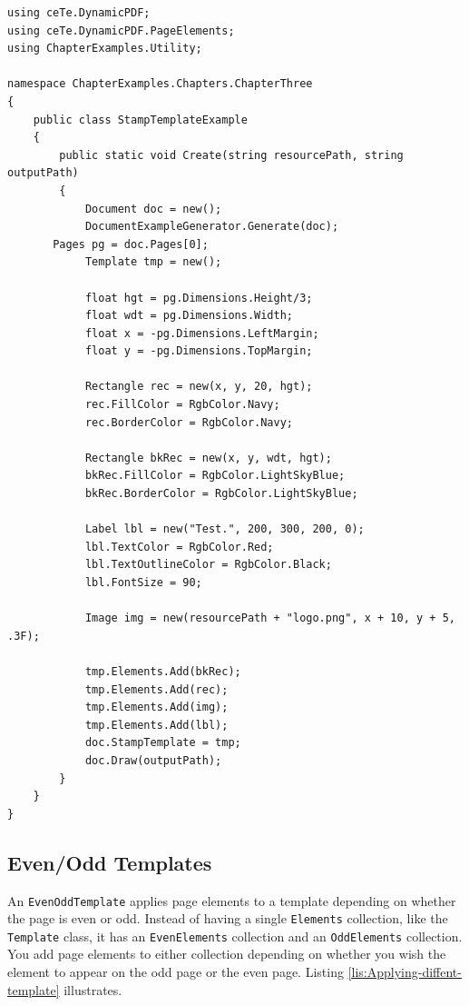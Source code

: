 \documentclass[american,letterpaper]{tufte-book}
\numberwithin{equation}{section}
\numberwithin{figure}{section}
\begin{document}
\bgroup{}
\begin{lstlisting}[caption={Using a stamp template.},label={lis:forground-Using-a-stamp},basicstyle={\small\ttfamily},breaklines=true]
using ceTe.DynamicPDF;
using ceTe.DynamicPDF.PageElements;
using ChapterExamples.Utility;

namespace ChapterExamples.Chapters.ChapterThree
{
    public class StampTemplateExample
    {
        public static void Create(string resourcePath, string outputPath)
        {
            Document doc = new();
            DocumentExampleGenerator.Generate(doc);
       Pages pg = doc.Pages[0];
            Template tmp = new();

            float hgt = pg.Dimensions.Height/3;
            float wdt = pg.Dimensions.Width;
            float x = -pg.Dimensions.LeftMargin;
            float y = -pg.Dimensions.TopMargin;

            Rectangle rec = new(x, y, 20, hgt);
            rec.FillColor = RgbColor.Navy;
            rec.BorderColor = RgbColor.Navy;

            Rectangle bkRec = new(x, y, wdt, hgt);
            bkRec.FillColor = RgbColor.LightSkyBlue;
            bkRec.BorderColor = RgbColor.LightSkyBlue;

            Label lbl = new("Test.", 200, 300, 200, 0);
            lbl.TextColor = RgbColor.Red;
            lbl.TextOutlineColor = RgbColor.Black;
            lbl.FontSize = 90;

            Image img = new(resourcePath + "logo.png", x + 10, y + 5, .3F);

            tmp.Elements.Add(bkRec);
            tmp.Elements.Add(rec);
            tmp.Elements.Add(img);
            tmp.Elements.Add(lbl);
            doc.StampTemplate = tmp;
            doc.Draw(outputPath);
        }
    }
}
\end{lstlisting}
\leavevmode\egroup


\subsection{Even/Odd Templates}

An \texttt{EvenOddTemplate} applies page elements to a template depending
on whether the page is even or odd. Instead of having a single \texttt{Elements}
collection, like the \texttt{Template} class, it has an \texttt{EvenElements}
collection and an \texttt{OddElements} collection. You add page elements
to either collection depending on whether you wish the element to
appear on the odd page or the even page. Listing \ref{lis:Applying-diffent-template}
illustrates.
\end{document}
